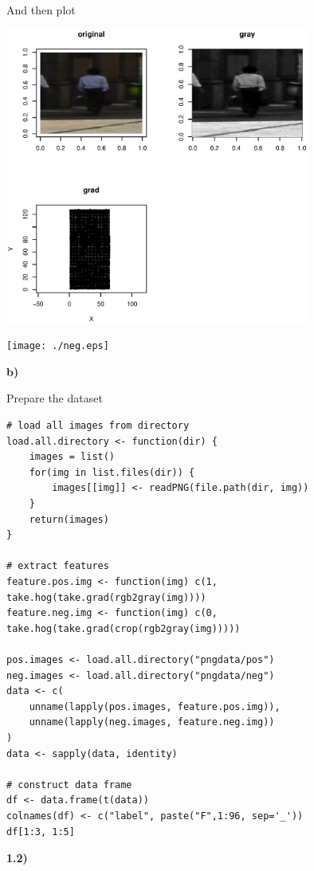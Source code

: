 \documentclass[11pt]{article}
\begin{document}
And then plot
\begin{center}
\includegraphics[width=0.75\textwidth]{./pos.eps}
\end{center}

\begin{center}
\texttt{[image: ./neg.eps]}
\end{center}



\textbf{b)}

Prepare the dataset
\begin{verbatim}
# load all images from directory
load.all.directory <- function(dir) {
    images = list()
    for(img in list.files(dir)) {
        images[[img]] <- readPNG(file.path(dir, img))
    }
    return(images)
}

# extract features
feature.pos.img <- function(img) c(1, take.hog(take.grad(rgb2gray(img))))
feature.neg.img <- function(img) c(0, take.hog(take.grad(crop(rgb2gray(img)))))

pos.images <- load.all.directory("pngdata/pos")
neg.images <- load.all.directory("pngdata/neg")
data <- c(
    unname(lapply(pos.images, feature.pos.img)),
    unname(lapply(neg.images, feature.neg.img))
)
data <- sapply(data, identity)

# construct data frame
df <- data.frame(t(data))
colnames(df) <- c("label", paste("F",1:96, sep='_'))
df[1:3, 1:5]
\end{verbatim}



\textbf{1.2)}
\end{document}
